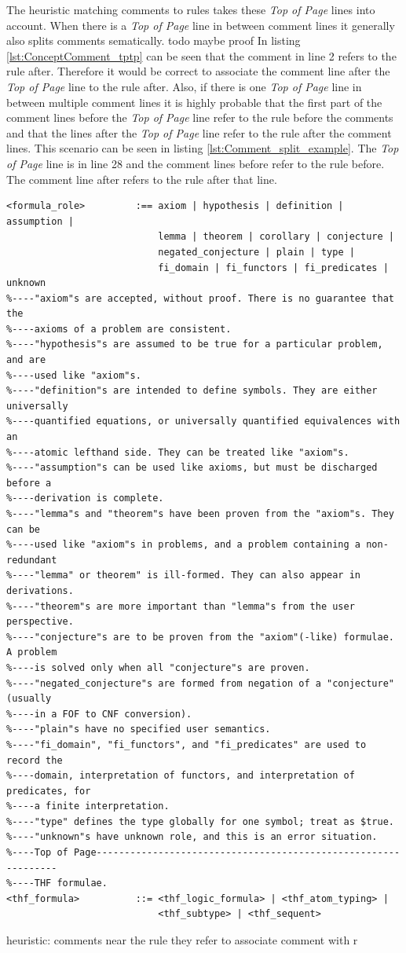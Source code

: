The heuristic matching comments to rules takes these \textit{Top of Page} lines into account.
When there is a \textit{Top of Page} line in between comment lines it generally also splits comments sematically. todo maybe proof
In listing \ref{lst:ConceptComment_tptp} can be seen that the comment in line 2 refers to the rule after.
Therefore it would be correct to associate the comment line after the \textit{Top of Page} line to the rule after.
Also, if there is one \textit{Top of Page} line in between multiple comment lines it is highly probable that the first part of the comment lines before the \textit{Top of Page} line refer to the rule before the comments and that the lines after the \textit{Top of Page} line refer to the rule after the comment lines.
This scenario can be seen in listing \ref{lst:Comment_split_example}. The \textit{Top of Page} line is in line 28 and the comment lines before refer to the rule before.
The comment line after refers to the rule after that line.
\begin{lstlisting}[language=none, basicstyle=\scriptsize	,caption=Example of comment lines split by a \textit{Top of Page} line in the \ac{TPTP} syntax,label= lst:Comment_split_example]
<formula_role>         :== axiom | hypothesis | definition | assumption |
                           lemma | theorem | corollary | conjecture |
                           negated_conjecture | plain | type |
                           fi_domain | fi_functors | fi_predicates | unknown
%----"axiom"s are accepted, without proof. There is no guarantee that the
%----axioms of a problem are consistent.
%----"hypothesis"s are assumed to be true for a particular problem, and are
%----used like "axiom"s.
%----"definition"s are intended to define symbols. They are either universally
%----quantified equations, or universally quantified equivalences with an
%----atomic lefthand side. They can be treated like "axiom"s.
%----"assumption"s can be used like axioms, but must be discharged before a
%----derivation is complete.
%----"lemma"s and "theorem"s have been proven from the "axiom"s. They can be
%----used like "axiom"s in problems, and a problem containing a non-redundant
%----"lemma" or theorem" is ill-formed. They can also appear in derivations.
%----"theorem"s are more important than "lemma"s from the user perspective.
%----"conjecture"s are to be proven from the "axiom"(-like) formulae. A problem
%----is solved only when all "conjecture"s are proven.
%----"negated_conjecture"s are formed from negation of a "conjecture" (usually
%----in a FOF to CNF conversion).
%----"plain"s have no specified user semantics.
%----"fi_domain", "fi_functors", and "fi_predicates" are used to record the
%----domain, interpretation of functors, and interpretation of predicates, for
%----a finite interpretation.
%----"type" defines the type globally for one symbol; treat as $true.
%----"unknown"s have unknown role, and this is an error situation.
%----Top of Page---------------------------------------------------------------
%----THF formulae.
<thf_formula>          ::= <thf_logic_formula> | <thf_atom_typing> |
                           <thf_subtype> | <thf_sequent>
\end{lstlisting}
heuristic:
comments near the rule they refer to
associate comment with r


